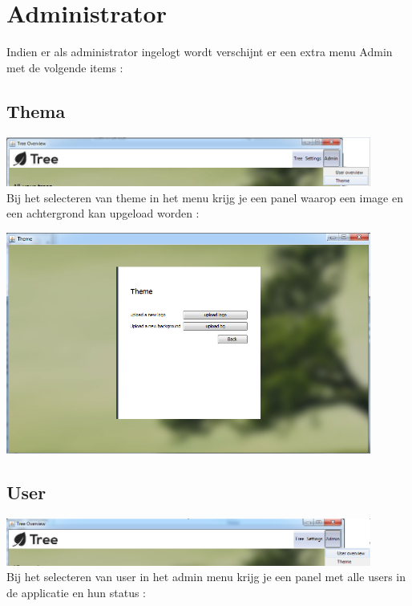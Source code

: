 \documentclass[pdftex,a4paper,12pt,twoside]{report}
\begin{document}
\section{Administrator}
Indien er als administrator ingelogt wordt verschijnt er een extra menu Admin met de volgende items :
\subsection{Thema}
\includegraphics[width=12cm]{images/admin_themeoverview_menu.png}\\[.5cm]

Bij het selecteren van theme in het menu krijg je een panel waarop een image en een achtergrond kan upgeload worden :

\includegraphics[width=12cm]{images/theme.png}\\[.5cm]

\subsection{User}

\includegraphics[width=12cm]{images/admin_useroverview_menu.png}\\[.5cm]

Bij het selecteren van user in het admin menu krijg je een panel met alle users in de applicatie en hun status : 
\end{document}
